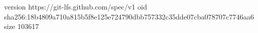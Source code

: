 version https://git-lfs.github.com/spec/v1
oid sha256:18b4809a710a815b5f8e125e724790dbb757332c35dde07cba078707c7746aa6
size 103617
